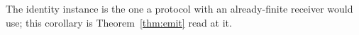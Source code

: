 
The identity instance is the one a protocol with an already-finite receiver
would use; this corollary is Theorem~\ref{thm:emit} read at it.

